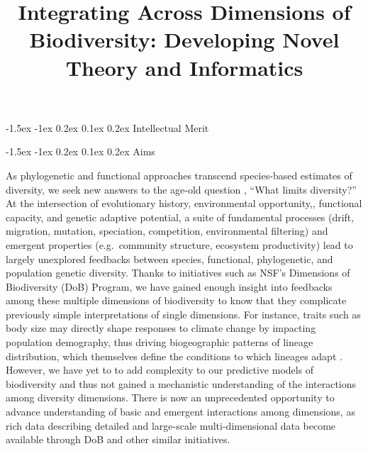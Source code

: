 \documentclass[11pt]{article}
\title{Integrating Across Dimensions of Biodiversity: Developing Novel Theory and Informatics}
\author{}
\date{}
\makeatletter
\renewcommand\section{\@startsection{section}{1}{\z@}%
                                  {-1.5ex \@plus -1ex \@minus 0.2ex}%
                                  {0.1ex \@plus 0.2ex}%
                                  {\normalfont\Large\bfseries}}
\renewcommand\subsection{\@startsection{subsection}{1}{\z@}%
                                  {-1.5ex \@plus -1ex \@minus 0.2ex}%
                                  {0.1ex \@plus 0.2ex}%
                                  {\normalfont\large\bfseries}}
\makeatother
\begin{document}

\section{Intellectual Merit}\label{intellectual-merit}

\subsection{Aims}\label{aims}

As phylogenetic and functional approaches transcend species-based
estimates of diversity, we seek new answers to the age-old question
\cite{Hutchinson1959-ob}, ``What limits diversity?'' At the
intersection of evolutionary history, environmental opportunity,,
functional capacity, and genetic adaptive potential, a suite of
fundamental processes (drift, migration, mutation, speciation,
competition, environmental filtering) and emergent properties
(e.g.~community structure, ecosystem productivity) lead to largely
unexplored feedbacks between species, functional, phylogenetic, and
population genetic diversity. Thanks to initiatives such as NSF's
Dimensions of Biodiversity (DoB) Program, we have gained enough
insight into feedbacks among these multiple dimensions of biodiversity
to know that they complicate previously simple interpretations of
single dimensions. For instance, traits such as body size may directly
shape responses to climate change by impacting population demography,
thus driving biogeographic patterns of lineage distribution, which
themselves define the conditions to which lineages adapt
\cite{Prates2016-gr,Carnaval2014-je}. However, we have yet to to add
complexity to our predictive models of biodiversity and thus not
gained a mechanistic understanding of the interactions among diversity
dimensions. There is now an unprecedented opportunity to advance
understanding of basic and emergent interactions among dimensions, as
rich data describing detailed and large-scale multi-dimensional data
become available through DoB and other similar initiatives.
\end{document}
